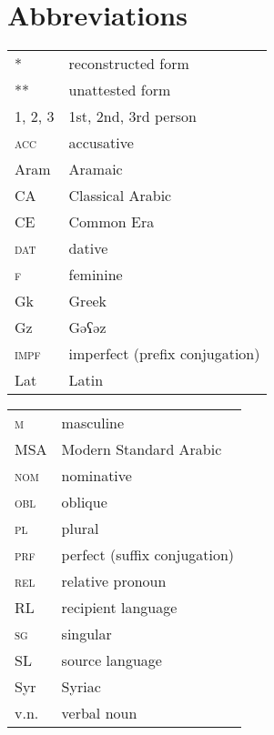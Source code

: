 \documentclass[output=paper]{langsci/langscibook}
\begin{document}
\section*{Abbreviations}
\begin{tabularx}{.5\textwidth}{@{}lQ@{}}
*             &  reconstructed form\\
**            &  unattested form\\
\textsc {1, 2, 3} & 1st, 2nd, 3rd person \\
\textsc{acc}  &  accusative\\
Aram         &  Aramaic\\
CA            &  Classical Arabic\\
CE            &  Common Era\\
\textsc{dat}  &  dative\\
\textsc{f}    &  feminine\\
Gk           &  Greek\\
Gz           &  Gəʕəz\\
\textsc{impf} &  imperfect (prefix conjugation)\\
Lat           &  Latin\\
\end{tabularx}%
\begin{tabularx}{.5\textwidth}{@{}lQ@{}}
\textsc{m}    &  masculine\\
MSA           &  Modern Standard Arabic\\
\textsc{nom}  &  nominative\\
\textsc{obl}  &  oblique\\
\textsc{pl}   &  plural\\
\textsc{prf}  &  perfect (suffix conjugation)\\
\textsc{rel}  &  relative pronoun\\
RL          &  recipient language\\
\textsc{sg}   &  singular\\
SL          &  source language\\
Syr          &  Syriac\\
v.n.         &  verbal noun\\
\end{tabularx}%


{\sloppy\printbibliography[heading=subbibliography,notkeyword=this]}
\end{document}
